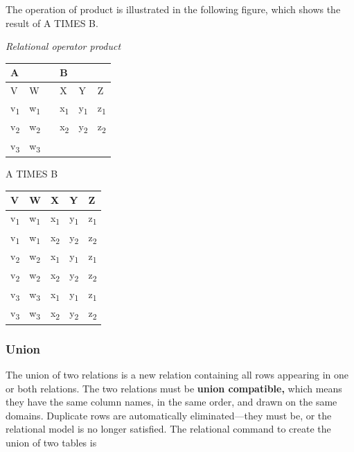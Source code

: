 \documentclass[
]{article}
\begin{document}
The operation of product is illustrated in the following figure, which
shows the result of A TIMES B.

\emph{Relational operator product}

\begin{longtable}[]{@{}llllll@{}}
\toprule
A & & & B & & \\
\midrule
\endhead
V & W & & X & Y & Z \\
v\textsubscript{1} & w\textsubscript{1} & & x\textsubscript{1} & y\textsubscript{1} & z\textsubscript{1} \\
v\textsubscript{2} & w\textsubscript{2} & & x\textsubscript{2} & y\textsubscript{2} & z\textsubscript{2} \\
v\textsubscript{3} & w\textsubscript{3} & & & & \\
\bottomrule
\end{longtable}

A TIMES B

\begin{longtable}[]{@{}lllll@{}}
\toprule
V & W & X & Y & Z \\
\midrule
\endhead
v\textsubscript{1} & w\textsubscript{1} & x\textsubscript{1} & y\textsubscript{1} & z\textsubscript{1} \\
v\textsubscript{1} & w\textsubscript{1} & x\textsubscript{2} & y\textsubscript{2} & z\textsubscript{2} \\
v\textsubscript{2} & w\textsubscript{2} & x\textsubscript{1} & y\textsubscript{1} & z\textsubscript{1} \\
v\textsubscript{2} & w\textsubscript{2} & x\textsubscript{2} & y\textsubscript{2} & z\textsubscript{2} \\
v\textsubscript{3} & w\textsubscript{3} & x\textsubscript{1} & y\textsubscript{1} & z\textsubscript{1} \\
v\textsubscript{3} & w\textsubscript{3} & x\textsubscript{2} & y\textsubscript{2} & z\textsubscript{2} \\
\bottomrule
\end{longtable}

\hypertarget{union}{%
\subsubsection*{Union}\label{union}}

The union of two relations is a new relation containing all rows
appearing in one or both relations. The two relations must be \textbf{union
compatible,} which means they have the same column names, in the same
order, and drawn on the same domains. Duplicate rows are automatically
eliminated---they must be, or the relational model is no longer
satisfied. The relational command to create the union of two tables is
\end{document}
